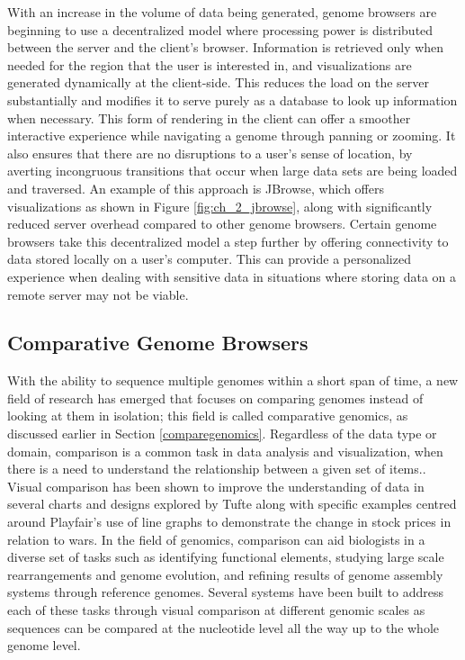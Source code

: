 With an increase in the volume of data being generated, genome browsers are beginning to use a decentralized model where processing power is distributed between the server and the client's browser. Information is retrieved only when needed for the region that the user is interested in, and visualizations are generated dynamically at the client-side. This reduces the load on the server substantially and modifies it to serve purely as a database to look up information when necessary. This form of rendering in the client can offer a smoother interactive experience while navigating a genome through panning or zooming. It also ensures that there are no disruptions to a user's sense of location, by averting incongruous transitions that occur when large data sets are being loaded and traversed. An example of this approach is JBrowse, which offers visualizations as shown in Figure \ref{fig:ch_2_jbrowse}, along with significantly reduced server overhead compared to other genome browsers\cite{skinner2009jbrowse}.
Certain genome browsers take this decentralized model a step further by offering connectivity to data stored locally on a user's computer\cite{ucscgenome,saito2009utgb}. This can provide a personalized experience when dealing with sensitive data in situations where storing data on a remote server may not be viable. 

\subsection{Comparative Genome Browsers}
With the ability to sequence multiple genomes within a short span of time, a new field of research has emerged that focuses on comparing genomes instead of looking at them in isolation; this field is called comparative genomics, as discussed earlier in Section \ref{comparegenomics}. Regardless of the data type or domain, comparison is a common task in data analysis and visualization, when there is a need to understand the relationship between a given set of items.\cite{gleicher2017considerations}. Visual comparison has been shown to improve the understanding of data in several charts and designs explored by Tufte\cite{tufte1990envisioning} along with specific examples centred around Playfair's use of line graphs to demonstrate the change in stock prices in relation to wars\cite{costigan1990william}. In the field of genomics, comparison can aid biologists in a diverse set of tasks such as identifying functional elements, studying large scale rearrangements and genome evolution, and refining results of genome assembly systems through reference genomes\cite{nielsen2010visualizing}. Several systems have been built to address each of these tasks through visual comparison at different genomic scales as sequences can be compared at the nucleotide level all the way up to the whole genome level.


